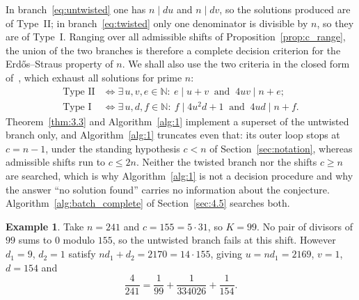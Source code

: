 \documentclass[11pt, a4paper]{article}
\theoremstyle{plain}
\theoremstyle{definition}
\newtheorem{example}[theorem]{Example}
\newcommand{\N}{\mathbb{N}}
\begin{document}
In branch~\eqref{eq:untwisted} one has $n\mid du$ and $n\mid dv$, so the solutions produced are of Type~II; in branch~\eqref{eq:twisted} only one denominator is divisible by $n$, so they are of Type~I. Ranging over all admissible shifts of Proposition~\ref{prop:c_range}, the union of the two branches is therefore a complete decision criterion for the Erd\H{o}s--Straus property of $n$. We shall also use the two criteria in the closed form of~\cite[Cor.~2.2 and Cor.~2.4]{pomerance2026}, which exhaust all solutions for prime $n$:
\begin{align}
\text{Type~II} &\iff \exists\, u,v,e\in\N:\ e\mid u+v \ \text{ and }\ 4uv\mid n+e; \label{eq:PW2}\\
\text{Type~I} &\iff \exists\, u,d,f\in\N:\ f\mid 4u^{2}d+1 \ \text{ and }\ 4ud\mid n+f. \label{eq:PW1}
\end{align}
Theorem~\ref{thm:3.3} and Algorithm~\ref{alg:1} implement a superset of the untwisted branch only, and Algorithm~\ref{alg:1} truncates even that: its outer loop stops at $c=n-1$, under the standing hypothesis $c<n$ of Section~\ref{sec:notation}, whereas admissible shifts run to $c\le2n$. Neither the twisted branch nor the shifts $c\ge n$ are searched, which is why Algorithm~\ref{alg:1} is not a decision procedure and why the answer ``no solution found'' carries no information about the conjecture. Algorithm~\ref{alg:batch_complete} of Section~\ref{sec:4.5} searches both.

\begin{example}\label{ex:twisted}
Take $n=241$ and $c=155=5\cdot31$, so $K=99$. No pair of divisors of $99$ sums to $0$ modulo $155$, so the untwisted branch fails at this shift. However $d_1=9$, $d_2=1$ satisfy $n d_1+d_2 = 2170 = 14\cdot 155$, giving $u=nd_1=2169$, $v=1$, $d=154$ and
$$\frac{4}{241}=\frac{1}{99}+\frac{1}{334026}+\frac{1}{154}.$$
\end{example}
\end{document}
